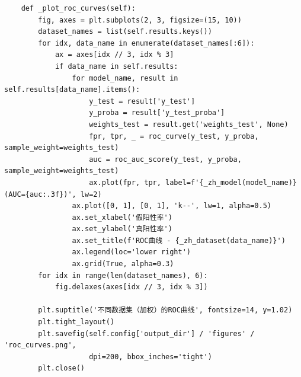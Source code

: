 \begin{lstlisting}
    def _plot_roc_curves(self):
        fig, axes = plt.subplots(2, 3, figsize=(15, 10))
        dataset_names = list(self.results.keys())
        for idx, data_name in enumerate(dataset_names[:6]):
            ax = axes[idx // 3, idx % 3]
            if data_name in self.results:
                for model_name, result in self.results[data_name].items():
                    y_test = result['y_test']
                    y_proba = result['y_test_proba']
                    weights_test = result.get('weights_test', None)
                    fpr, tpr, _ = roc_curve(y_test, y_proba, sample_weight=weights_test)
                    auc = roc_auc_score(y_test, y_proba, sample_weight=weights_test)
                    ax.plot(fpr, tpr, label=f'{_zh_model(model_name)} (AUC={auc:.3f})', lw=2)
                ax.plot([0, 1], [0, 1], 'k--', lw=1, alpha=0.5)
                ax.set_xlabel('假阳性率')
                ax.set_ylabel('真阳性率')
                ax.set_title(f'ROC曲线 - {_zh_dataset(data_name)}')
                ax.legend(loc='lower right')
                ax.grid(True, alpha=0.3)
        for idx in range(len(dataset_names), 6):
            fig.delaxes(axes[idx // 3, idx % 3])

        plt.suptitle('不同数据集（加权）的ROC曲线', fontsize=14, y=1.02)
        plt.tight_layout()
        plt.savefig(self.config['output_dir'] / 'figures' / 'roc_curves.png',
                    dpi=200, bbox_inches='tight')
        plt.close()

\end{lstlisting}